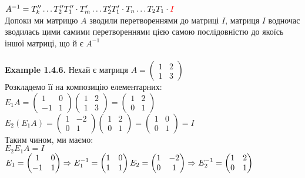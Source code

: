 \documentclass[a4paper, 10pt]{article}
\def\ex#1{\textbf{Example {#1}}}
\theoremstyle{theoremdd}
\theoremstyle{theoremdd}
\theoremstyle{theoremdd}
\theoremstyle{theoremdd}
\theoremstyle{theoremdd}
\theoremstyle{theoremdd}
\theoremstyle{theoremdd}
\theoremstyle{theoremdd}
\begin{document}
	$A^{-1} = T_k'' \dots T_2'' T_1'' \cdot T_m' \dots T_2' T_1' \cdot T_n \dots T_2 T_1 \cdot \textcolor{red}{I}$\\
	Допоки ми матрицю $A$ зводили перетвореннями до матриці $I$, матриця $I$ водночас зводилась цими самими перетвореннями цією самою послідовністю до якоїсь іншої матриці, що й є $A^{-1}$\\
	\bigskip \\
	\ex{1.4.6.} Нехай є матриця $A = \begin{pmatrix} 1 & 2 \\ 1 & 3 \end{pmatrix}$\\
	Розкладемо її на композицію елементарних:\\
	$E_1 A = \begin{pmatrix}1 & 0 \\ -1 & 1 \end{pmatrix} \begin{pmatrix}1 & 2 \\ 1 & 3 \end{pmatrix} = \begin{pmatrix} 1 & 2 \\ 0 & 1 \end{pmatrix}$\\
	$E_2 (E_1 A) = \begin{pmatrix} 1 & -2 \\ 0 & 1 \end{pmatrix} \begin{pmatrix} 1 & 2 \\ 0 & 1 \end{pmatrix} = \begin{pmatrix}
	1 & 0 \\
	0 & 1
	\end{pmatrix} = I$\\
	Таким чином, ми маємо:\\
	$E_2 E_1 A = I$\\
	$E_1 = \begin{pmatrix}
	1 & 0 \\
	-1 & 1
	\end{pmatrix} \Rightarrow E_1^{-1} = \begin{pmatrix}
	1 & 0 \\
	1 & 1
\end{pmatrix}	 \\ E_2 = \begin{pmatrix}
	1 & -2 \\
	0 & 1
	\end{pmatrix} \Rightarrow E_2^{-1} = \begin{pmatrix}
	1 & 2 \\
	0 & 1
	\end{pmatrix}$\\
\end{document}
